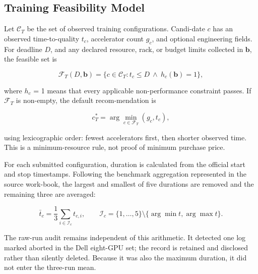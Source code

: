 \documentclass[final,3p,12pt,nopreprintline]{elsarticle}
\begin{document}
\subsection{Training Feasibility Model}


Let $\mathcal{C}_T$ be the set of observed training configurations. Candi-date $c$ has an observed time-to-quality $t_c$, accelerator count $g_c$, and optional engineering fields. For deadline $D$, and any declared resource, rack, or budget limits collected in $\boldsymbol{b}$, the feasible set is


\begin{equation}
\mathcal{F}_T(D,\boldsymbol{b})=\{c\in\mathcal{C}_T:t_c\leq D\ \wedge\ h_c(\boldsymbol{b})=1\},
\label{eq:trainset}
\end{equation}

where $h_c$ = 1 means that every applicable non-performance constraint passes. If $\mathcal{F}_T$ is non-empty, the default recom-mendation is


\begin{equation}
c_T^*=\arg\min_{c\in\mathcal{F}_T}(g_c,t_c),
\label{eq:trainrank}
\end{equation}

using lexicographic order: fewest accelerators first, then shorter observed time. This is a minimum-resource rule, not proof of minimum purchase price.


For each submitted configuration, duration is calculated from the official start and stop timestamps. Following the benchmark aggregation represented in the source work-book, the largest and smallest of five durations are removed and the remaining three are averaged:


\begin{equation}
\bar t_c=\frac{1}{3}\sum_{i\in\mathcal{I}_c}t_{c,i}, \qquad
\mathcal{I}_c=\{1,\ldots,5\}\setminus\{\arg\min t,\arg\max t\}.
\label{eq:trimmed}
\end{equation}

The raw-run audit remains independent of this arithmetic. It detected one log marked aborted in the Dell eight-GPU set; the record is retained and disclosed rather than silently deleted. Because it was also the maximum duration, it did not enter the three-run mean.
\end{document}
